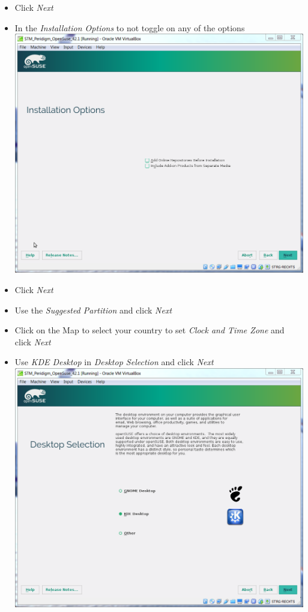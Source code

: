 \begin{enumerate}[noitemsep]
\begin{itemize}
   \item Click \textit{Next}
   \item In the \textit{Installation Options} to not toggle on any of the options\\
   \includegraphics[scale=0.25]{Figures/VirtualBox_VirtualMachine_OperatingSystem_InstallationOptions}
   \item Click \textit{Next}
   \item Use the \textit{Suggested Partition} and click \textit{Next}
   \item Click on the Map to select your country to set \textit{Clock and Time Zone} and click \textit{Next}
   \item Use \textit{KDE Desktop} in \textit{Desktop Selection} and click \textit{Next}\\
   \includegraphics[scale=0.25]{Figures/VirtualBox_VirtualMachine_OperatingSystem_DesktopSelection}

\end{itemize}
\end{enumerate}

